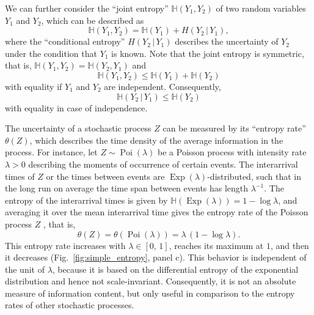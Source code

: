\documentclass[smallextended]{svjour3}
\renewcommand{\H}{\mathbb{H}}
\newcommand{\Exp}{\operatorname{Exp}}
\newcommand{\Poi}{\operatorname{Poi}}
\newcommand{\ie}{that is}
\renewcommand{\emph}[1]{``#1''}
\begin{document}
We can further consider the \emph{joint entropy} $\H(Y_1,Y_2)$ of two random variables $Y_1$ and $Y_2$, which can be described as 
\begin{equation}
  \H(Y_1,Y_2) = \H(Y_1) + H(Y_2\,|\,Y_1),
\end{equation}
where the \emph{conditional entropy} $H(Y_2\,|\,Y_1)$ describes the uncertainty of $Y_2$ under the condition that $Y_1$ is known.
Note that the joint entropy is symmetric, \ie, $\H(Y_1,Y_2)=\H(Y_2,Y_1)$ and 
\begin{equation}
  \H(Y_1,Y_2)\leq \H(Y_1) + \H(Y_2)
\end{equation}
with equality if $Y_1$ and $Y_2$ are independent.
Consequently, 
\begin{equation}
  \H(Y_2\,|\,Y_1)\leq \H(Y_2)
\end{equation}
with equality in case of independence.

The uncertainty of a stochastic process $Z$ can be measured by its \emph{entropy rate} $\theta(Z)$, which describes the time density of the average information in the process.
For instance, let $Z\sim\Poi(\lambda)$ be a Poisson process with intensity rate $\lambda>0$ describing the moments of occurrence of certain events.
The interarrival times of $Z$ or the times between events are $\Exp(\lambda)$-distributed, such that in the long run on average the time span between events has length $\lambda^{-1}$.
The entropy of the interarrival times is given by $\H(\Exp(\lambda))=1-\log \lambda$, and averaging it over the mean interarrival time gives the entropy rate of the Poisson process $Z$ \citep[Sect.~3.3]{Gaspard1993PR}, \ie,
\begin{equation}
  \theta(Z) = \theta(\Poi(\lambda)) = \lambda\,(1-\log \lambda).
\end{equation}
This entropy rate increases with $\lambda\in[0,\,1]$, reaches its maximum at $1$, and then it decreases (Fig.~\ref{fig:simple_entropy}, panel c).
This behavior is independent of the unit of $\lambda$, because it is based on the differential entropy of the exponential distribution and hence not scale-invariant.
Consequently, it is not an absolute measure of information content, but only useful in comparison to the entropy rates of other stochastic processes.
\end{document}
